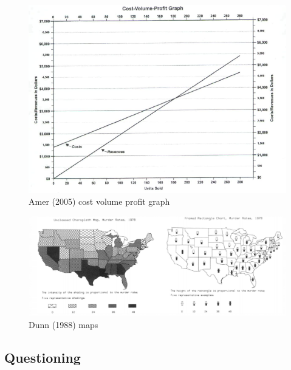 \documentclass[print]{nuthesis}
\begin{document}
\begin{figure}[tbp]

{\centering \includegraphics[width=1\linewidth,]{images/amer-poggendorff-illusion} 

}

\caption{Amer (2005) cost volume profit graph}\label{fig:amer-poggendorff-illusion}
\end{figure}

\begin{figure}[tbp]

{\centering \includegraphics[width=1\linewidth,]{images/framed-murder-rate-map} 

}

\caption{Dunn (1988) maps}\label{fig:framed-murder-rate-map}
\end{figure}

\hypertarget{lit-questioning}{%
\subsection{Questioning}\label{lit-questioning}}
\end{document}
